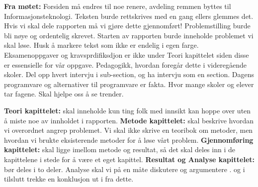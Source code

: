 \hspace{-17pt}\textbf{Fra møtet:}\newline
Forsiden må endres til noe renere, avdeling remmen byttes til Informasjonsteknologi.\newline
Teksten burde rettskrives med en gang ellers glemmes det.\newline
Hvis vi skal dele rapporten må vi gjøre dette gjennomført!\newline
Problemstilling burde bli nøye og ordentelig skrevet.\newline
Starten av rapporten burde inneholde problemet vi skal løse.\newline
Husk å markere tekst som ikke er endelig i egen farge.\newline
Eksamenoppgaver og kravsprdifiksdjon er ikke under Teori kapittelet siden disse er essensielle for vår oppgave.\newline
Pedagogikk, hvordan foregår dette i videregående skoler.\newline
Del opp hvert intervju i sub-section, og ha intervju som en section.\newline
Dagens programvare og alternativer til programvare er fakta.
Hvor mange skoler og elever tar fagene. Skal hjelpe oss å se trender.\newline

\hspace{-17pt}\textbf{Teori kapittelet:} skal inneholde kun ting folk med innsikt kan hoppe over uten å miste noe av innholdet i rapporten.\newline
\hspace{-17pt}\textbf{Metode kapittelet:} skal beskrive hvordan vi overordnet angrep problemet. Vi skal ikke skrive en teoribok om metoder, men hvordan vi brukte eksisterende metoder for å løse vårt problem.\newline
\hspace{-17pt}\textbf{Gjennomføring kapittelet:} skal ligge imellom metode og resultat, så det skal deles inn i de kapittelene i stede for å være et eget kapittel.\newline
\hspace{-17pt}\textbf{Resultat og Analyse kapittelet:} bør deles i to deler. Analyse skal vi på en måte diskutere og argumentere . og i tilslutt trekke en konklusjon ut i fra dette.\newline

